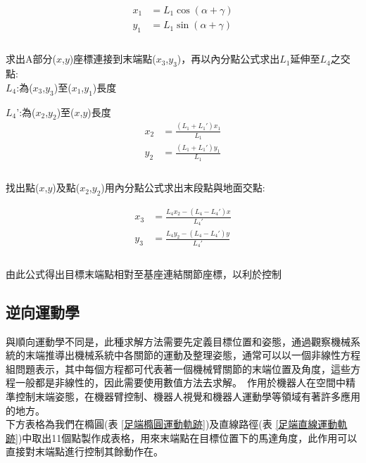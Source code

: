 \[
\begin{aligned}
x_{1}&=L_{1}\cos \left( \alpha +\gamma \right)\\
y_{1}&=L_{1}\sin \left( \alpha +\gamma \right)\\
\end{aligned}
\]\\

求出A部分($x$,$y$)座標連接到末端點($x_3$,$y_3$)，再以內分點公式求出$L_1$延伸至$L_4$之交點:\\

$L_4$:為($x_3$,$y_3$)至($x_1$,$y_1$)長度\

$L_4$':為($x_2$,$y_2$)至($x$,$y$)長度\\

\[
\begin{aligned}
x_{2}&= \frac{\left (L_{1} + L_{1}' \right) x_{1}}{L_{1}}\\
y_{2}&= \frac{\left (L_{1} + L_{1}' \right) y_{1}}{L_{1}}\\
\end{aligned}
\]\\

找出點($x$,$y$)及點($x_2$,$y_2$)用內分點公式求出末段點與地面交點:

\[
\begin{aligned}
x_{3}&= \frac{L_{4} x_{2} - \left (L_{4} - L_{4}' \right) x}{L_{4}'}\\
y_{3}&= \frac{L_{4} y_{2} - \left (L_{4} - L_{4}' \right) y}{L_{4}'}\\
\end{aligned}
\]\\

由此公式得出目標末端點相對至基座連結關節座標，以利於控制\\

\subsection{逆向運動學}
與順向運動學不同是，此種求解方法需要先定義目標位置和姿態，通過觀察機械系統的末端推導出機械系統中各關節的運動及整理姿態，通常可以以一個非線性方程組問題表示，其中每個方程都可代表著一個機械臂關節的末端位置及角度，這些方程一般都是非線性的，因此需要使用數值方法去求解。\
作用於機器人在空間中精準控制末端姿態，在機器臂控制、機器人視覺和機器人運動學等領域有著許多應用的地方。\\

下方表格為我們在橢圓(表 \ref{足端橢圓運動軌跡})及直線路徑(表 \ref{足端直線運動軌跡})中取出11個點製作成表格，用來末端點在目標位置下的馬達角度，此作用可以直接對末端點進行控制其餘動作在。

